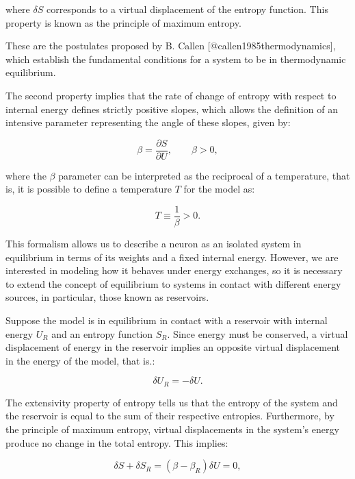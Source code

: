 \documentclass[12pt]{article}
\begin{document}
where $\delta S$ corresponds to a virtual displacement of the entropy function. This property is known as the principle of maximum entropy.

These are the postulates proposed by B. Callen [@callen1985thermodynamics], which establish the fundamental conditions for a system to be in thermodynamic equilibrium.

The second property implies that the rate of change of entropy with respect to internal energy defines strictly positive slopes, which allows the definition of an intensive parameter representing the angle of these slopes, given by:

\begin{equation}
\beta = \frac{\partial S}{\partial U}, \qquad \beta > 0,
\end{equation}

where the $\beta$ parameter can be interpreted as the reciprocal of a temperature, that is, it is possible to define a temperature $T$ for the model as:

\begin{equation}
T \equiv \frac{1}{\beta} > 0.
\end{equation}

This formalism allows us to describe a neuron as an isolated system in equilibrium in terms of its weights and a fixed internal energy. However, we are interested in modeling how it behaves under energy exchanges, so it is necessary to extend the concept of equilibrium to systems in contact with different energy sources, in particular, those known as reservoirs.

Suppose the model is in equilibrium in contact with a reservoir with internal energy $U_R$ and an entropy function $S_R$. Since energy must be conserved, a virtual displacement of energy in the reservoir implies an opposite virtual displacement in the energy of the model, that is.:

\begin{equation}
\delta U_R = -\delta U.
\end{equation}

The extensivity property of entropy tells us that the entropy of the system and the reservoir is equal to the sum of their respective entropies. Furthermore, by the principle of maximum entropy, virtual displacements in the system’s energy produce no change in the total entropy. This implies:

\begin{equation}
\delta S + \delta S_R = (\beta-\beta_R) \delta U = 0,
\end{equation}
\end{document}
